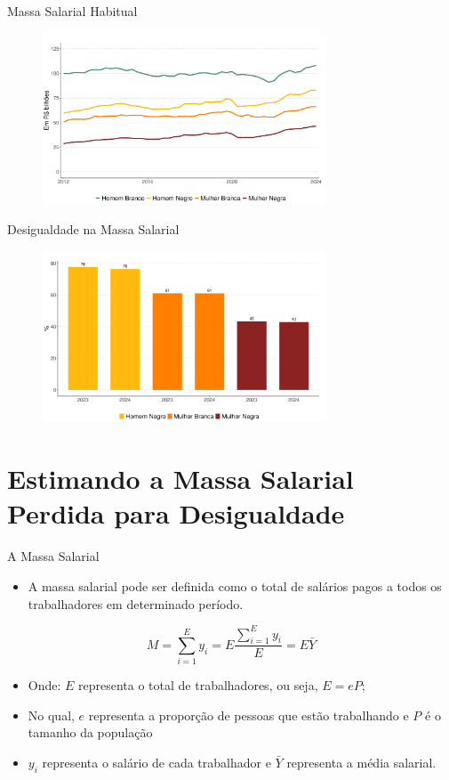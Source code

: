 \documentclass[10pt, xcolor=x11names,compress]{beamer}
\begin{document}
	\begin{frame}{Massa Salarial Habitual}
		\begin{figure}
			\centering
			\includegraphics[width = 0.75\textwidth]{figures_output/massa_habitual_gen_raca.pdf}
		\end{figure}
	\end{frame}
	
	\begin{frame}{Desigualdade na Massa Salarial}
		\begin{figure}
			\centering
			\includegraphics[width = 0.75\textwidth]{figures_output/frac_massa_habitual.pdf}
		\end{figure}
	\end{frame}		
	
	\section{Estimando a Massa Salarial Perdida para Desigualdade}
	\begin{frame}{A Massa Salarial}
	\begin{itemize}
		\item A massa salarial pode ser definida como o total de salários pagos a todos os trabalhadores em determinado período.
	\end{itemize}
	\begin{equation}
		M = \sum_{i =1}^{E} y_{i} = E \frac{\sum_{i =1}^{E} y_{i}}{E} = E \bar{Y}
	\end{equation}
	\begin{itemize}
		\item 	Onde: $E$ representa o total de trabalhadores, ou seja, $E = eP$; 
		\item	No qual, $e$ representa a proporção de pessoas que estão trabalhando e $P$ é o tamanho da população
		\item	$y_{i}$ representa o salário de cada trabalhador e $\bar{Y}$ representa a média salarial. 
	 \end{itemize}	
	\end{frame}	
	
\end{document}
